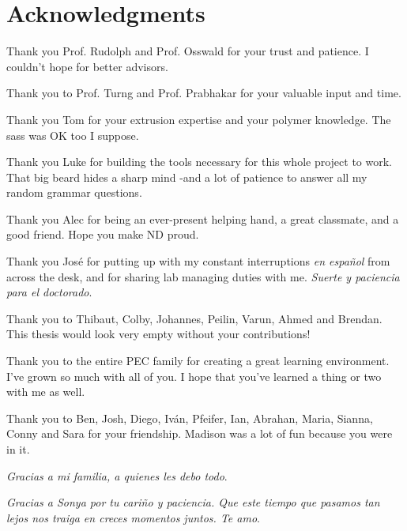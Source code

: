 \documentclass[main.tex]{subfiles}
\begin{document}
\chapter*{Acknowledgments}
{
\setlength{\parindent}{0cm}
\setlength{\parskip}{12pt}
Thank you Prof. Rudolph and Prof. Osswald for your trust and patience. I couldn't hope for better advisors.

Thank you to Prof. Turng and Prof. Prabhakar for your valuable input and time. 
     
Thank you Tom for your extrusion expertise and your polymer knowledge. The sass was OK too I suppose.

Thank you Luke for building the tools necessary for this whole project to work. That big beard hides a sharp mind -and a lot of patience to answer all my random grammar questions.

Thank you Alec for being an ever-present helping hand, a great classmate, and a good friend. Hope you make ND proud.

Thank you Jos\'e for putting up with my constant interruptions \emph{en espa\~nol} from across the desk, and for sharing lab managing duties with me. \emph{Suerte y paciencia para el doctorado}. 

Thank you to Thibaut, Colby, Johannes, Peilin, Varun, Ahmed and Brendan. This thesis would look very empty without your contributions!
    
Thank you to the entire PEC family for creating a great learning environment. I've grown so much with all of you. I hope that you've learned a thing or two with me as well.

Thank you to Ben, Josh, Diego, Iv\'an, Pfeifer, Ian, Abrahan, Maria, Sianna, Conny and Sara for your friendship. Madison was a lot of fun because you were in it.

\emph{Gracias a mi familia, a quienes les debo todo}. 

\emph{Gracias a Sonya por tu cari\~no y paciencia. Que este tiempo que pasamos tan lejos nos traiga en creces momentos juntos. Te amo}.  
}
\end{document}
